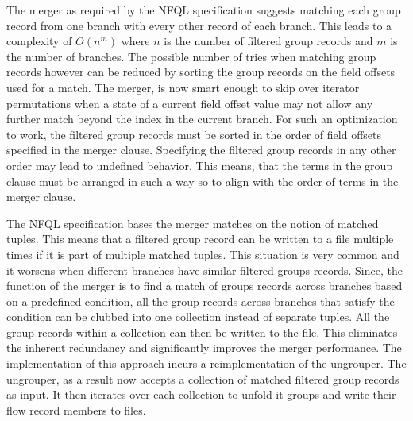 
The merger as required by the \ac{NFQL} specification suggests matching each
group record from one branch with every other record of each branch. This
leads to a complexity of $O(n^m)$ where $n$ is the number of filtered group
records and $m$ is the number of branches. The possible number of tries when
matching group records however can be reduced by sorting the group records on
the field offsets used for a match. The merger, is now smart enough to skip
over iterator permutations  when a state of a current field offset value may not allow any
further match beyond the index in the current branch. For such an optimization
to work, the filtered group records must be sorted in the order of field
offsets specified in the merger clause. Specifying the filtered group records
in any other order may lead to undefined behavior. This means, that the terms
in the group clause must be arranged in such a way so to align with the order
of terms in the merger clause.

The \ac{NFQL} specification bases the merger matches on the notion of matched
tuples. This means that a filtered group record can be written to a file
multiple times if it is part of multiple matched tuples. This situation is
very common and it worsens when different branches have similar filtered
groups records. Since, the function of the merger is to find a match of groups
records across branches based on a predefined  condition, all the group records across branches that
satisfy the condition can be clubbed into one collection instead of separate
tuples. All the group records within a collection can then be written to the
file. This eliminates the inherent redundancy and significantly improves the
merger performance. The implementation of this approach incurs a
reimplementation of the ungrouper. The ungrouper, as a result now accepts a
collection of matched filtered group records as input. It then iterates over
each collection to unfold it groups and write their flow record members to
files.

